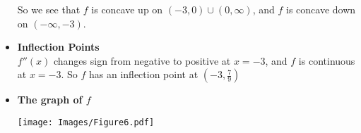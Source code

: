 \documentclass[handout,nooutcomes]{ximera}
\renewenvironment{freeResponse}{
\ifhandout\setbox0\vbox\bgroup\else
\begin{trivlist}\item[\hskip \labelsep\bfseries Solution:\hspace{2ex}]
\fi}
{\ifhandout\egroup\else
\end{trivlist}
\fi}
\newcommand{\dfn}{\textbf}
\begin{document}
\begin{problem}
\begin{freeResponse}
\begin{itemize}
       So we see that $f$ is concave up on $(-3,0) \cup (0,\infty)$, and $f$ is concave down on $(-\infty, -3)$.
     \item
       \dfn{Inflection Points}  \\
       $f''(x)$ changes sign from negative to positive at $x=-3$, and $f$ is continuous at $x=-3$.
       So $f$ has an inflection point at $\left( -3, \frac{7}{9} \right)$
			
       \newpage

     \item
       \dfn{The graph of $f$}
       \begin{image}
         \texttt{[image: Images/Figure6.pdf]}
       \end{image}

    \end{itemize}
  \end{freeResponse}
\end{problem}
\end{document}
